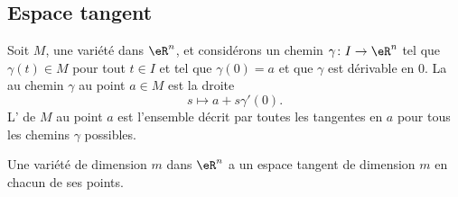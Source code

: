 \subsection{Espace tangent}

Soit $M$, une variété dans $\eR^n$, et considérons un chemin $\gamma\colon I\to \eR^n$ tel que $\gamma(t)\in M$ pour tout $t\in I$ et tel que $\gamma(0)=a$ et que $\gamma$ est dérivable en $0$. La  au chemin $\gamma$ au point $a\in M$ est la droite
\begin{equation}
	s\mapsto a+s\gamma'(0).
\end{equation}
L' de $M$ au point $a$ est l'ensemble décrit par toutes les tangentes en $a$ pour tous les chemins $\gamma$ possibles.

\begin{proposition}			\label{PropDimEspTanVarConst}
	Une variété de dimension $m$ dans $\eR^n$ a un espace tangent de dimension $m$ en chacun de ses points.
\end{proposition}
